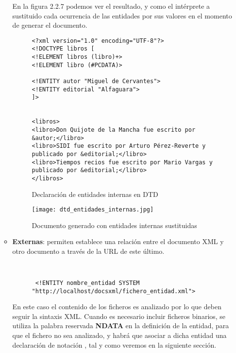 \begin{itemize}
\begin{itemize}
        En la figura 2.2.7 podemos ver el resultado, y como el intérprete a sustituido cada ocurrencia de las entidades por sus valores en el momento de generar el documento.

       \begin{figure}[H]
           \begin{tcolorbox}[sharp corners, colback=yellow!30, colframe=white!20]
               \scriptsize
               \begin{verbatim}
<?xml version="1.0" encoding="UTF-8"?>
<!DOCTYPE libros [
<!ELEMENT libros (libro)+>
<!ELEMENT libro (#PCDATA)>

<!ENTITY autor "Miguel de Cervantes">
<!ENTITY editorial "Alfaguara">
]>


<libros>
<libro>Don Quijote de la Mancha fue escrito por &autor;</libro>
<libro>SIDI fue escrito por Arturo Pérez-Reverte y publicado por &editorial;</libro>
<libro>Tiempos recios fue escrito por Mario Vargas y publicado por &editorial;</libro>
</libros>
               \end{verbatim}
           \end{tcolorbox}
           \caption{Declaración de entidades internas en DTD}
       \end{figure}

            \begin{figure}[ht]
            \centering
            \texttt{[image: dtd\_entidades\_internas.jpg]}
            \caption{Documento generado con entidades internas sustituidas}
        \end{figure}

     \item \textbf{Externas}: permiten establece una relación entre el documento XML y otro documento a través de la URL de este último.

     \begin{figure}[h]
         \begin{tcolorbox}[sharp corners, colback=yellow!30, colframe=white!20]
             \scriptsize
             \begin{verbatim}


 <!ENTITY nombre_entidad SYSTEM "http://localhost/docsxml/fichero_entidad.xml">
             \end{verbatim}
         \end{tcolorbox}
     \end{figure}

     En este caso el contenido de los ficheros es analizado por lo que deben seguir la sintaxis XML. Cuando es necesario incluir ficheros binarios, se utiliza la palabra reservada \textbf{NDATA} en la definición de la entidad, para que el fichero no sea analizado, y habrá que asociar a dicha entidad una declaración de notación , tal y como veremos en la siguiente sección.


\end{itemize}
\end{itemize}
